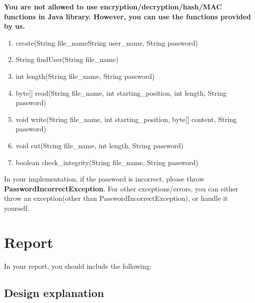 \documentclass[11pt]{article}
\begin{document}
\textbf{You are not allowed to use encryption/decryption/hash/MAC functions in Java library. However, you can use the functions provided by us.}

\begin{enumerate}

     \item create(String file\_nameString user\_name, String password)

     \item String findUser(String file\_name)

     \item int length(String file\_name, String password)

     \item byte[] read(String file\_name, int starting\_position, int length, String password)

     \item void write(String file\_name, int starting\_position, byte[] content, String password)

     \item void cut(String file\_name, int length, String password)

     \item boolean check\_integrity(String file\_name, String password)


\end{enumerate}

In your implementation, if the password is incorrect, please throw \textbf{PasswordIncorrectException}. For other exceptions/errors, you can either throw an exception(other than PasswordIncorrectException), or handle it yourself.

\section{Report}

In your report, you should include the following:

\subsection{Design explanation}
\end{document}
